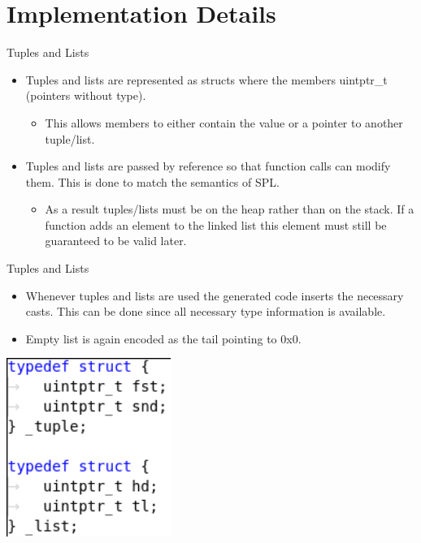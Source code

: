 \documentclass[10pt]{beamer}
\begin{document}
\section{Implementation Details}
\begin{frame}{Tuples and Lists}
    \begin{itemize}
        \item Tuples and lists are represented as structs where the members uintptr\_t (pointers without type).
        \begin{itemize}
            \item This allows members to either contain the value or a pointer to another tuple/list.
        \end{itemize}
        \item Tuples and lists are passed by reference so that function calls can modify them. This is done to match the semantics of SPL.
        \begin{itemize}
            \item As a result tuples/lists must be on the heap rather than on the stack. If a function adds an element to the linked list this element must still be guaranteed to be valid later.
        \end{itemize}
    \end{itemize}
\end{frame}

\begin{frame}{Tuples and Lists}
    \begin{itemize}
        \item Whenever tuples and lists are used the generated code inserts the necessary casts. This can be done since all necessary type information is available.
        \item Empty list is again encoded as the tail pointing to 0x0.
    \end{itemize}
    \includegraphics[width=0.4\textwidth]{presentation4/1.png}
\end{frame}
\end{document}
